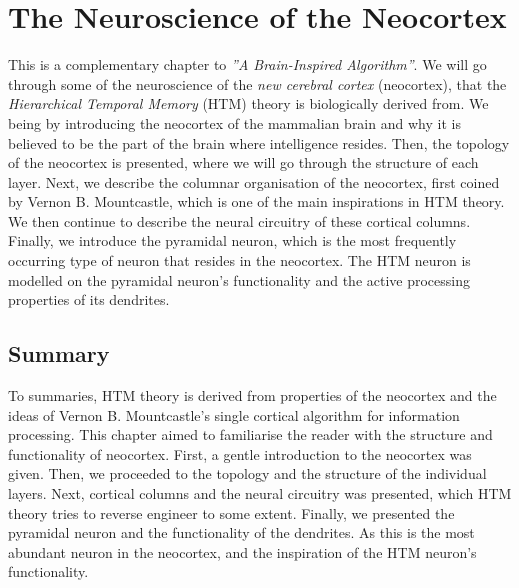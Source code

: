 \chapter{The Neuroscience of the Neocortex}
\label{chp_neocortex}
This is a complementary chapter to \textit{''A Brain-Inspired Algorithm''}. We will go through some of the neuroscience of the \textit{new cerebral cortex} (neocortex), that the \textit{Hierarchical Temporal Memory} (HTM) theory is biologically derived from. We being by introducing the neocortex of the mammalian brain and why it is believed to be the part of the brain where intelligence resides. Then, the topology of the neocortex is presented, where we will go through the structure of each layer. Next, we describe the columnar organisation of the neocortex, first coined by Vernon B. Mountcastle, which is one of the main inspirations in HTM theory. We then continue to describe the neural circuitry of these cortical columns. Finally, we introduce the pyramidal neuron, which is the most frequently occurring type of neuron that resides in the neocortex. The HTM neuron is modelled on the pyramidal neuron's functionality and the active processing properties of its dendrites. 






\section{Summary}
To summaries, HTM theory is derived from properties of the neocortex and the ideas of Vernon B. Mountcastle's single cortical algorithm for information processing. This chapter aimed to familiarise the reader with the structure and functionality of neocortex. First, a gentle introduction to the neocortex was given. Then, we proceeded to the topology and the structure of the individual layers. Next, cortical columns and the neural circuitry was presented, which HTM theory tries to reverse engineer to some extent. Finally, we presented the pyramidal neuron and the functionality of the dendrites. As this is the most abundant neuron in the neocortex, and the inspiration of the HTM neuron's functionality.








